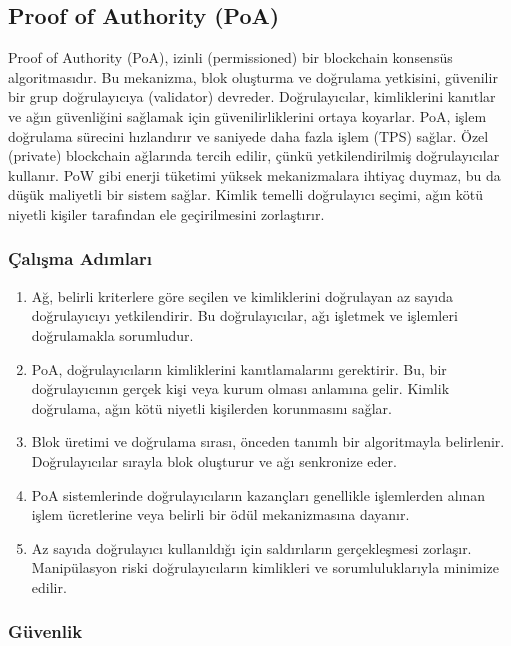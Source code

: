 \newpage

\subsection{Proof of Authority (PoA)}

Proof of Authority (PoA), izinli (permissioned) bir blockchain konsensüs algoritmasıdır. Bu mekanizma, blok oluşturma ve doğrulama yetkisini, güvenilir bir grup doğrulayıcıya (validator) devreder. Doğrulayıcılar, kimliklerini kanıtlar ve ağın güvenliğini sağlamak için güvenilirliklerini ortaya koyarlar. PoA, işlem doğrulama sürecini hızlandırır ve saniyede daha fazla işlem (TPS) sağlar. Özel (private) blockchain ağlarında tercih edilir, çünkü yetkilendirilmiş doğrulayıcılar kullanır. PoW gibi enerji tüketimi yüksek mekanizmalara ihtiyaç duymaz, bu da düşük maliyetli bir sistem sağlar. Kimlik temelli doğrulayıcı seçimi, ağın kötü niyetli kişiler tarafından ele geçirilmesini zorlaştırır.

\subsubsection{Çalışma Adımları}

\begin{enumerate}
    \item Ağ, belirli kriterlere göre seçilen ve kimliklerini doğrulayan az sayıda doğrulayıcıyı yetkilendirir. Bu doğrulayıcılar, ağı işletmek ve işlemleri doğrulamakla sorumludur.
    \item PoA, doğrulayıcıların kimliklerini kanıtlamalarını gerektirir. Bu, bir doğrulayıcının gerçek kişi veya kurum olması anlamına gelir. Kimlik doğrulama, ağın kötü niyetli kişilerden korunmasını sağlar.
    \item Blok üretimi ve doğrulama sırası, önceden tanımlı bir algoritmayla belirlenir. Doğrulayıcılar sırayla blok oluşturur ve ağı senkronize eder.
    \item PoA sistemlerinde doğrulayıcıların kazançları genellikle işlemlerden alınan işlem ücretlerine veya belirli bir ödül mekanizmasına dayanır.
    \item Az sayıda doğrulayıcı kullanıldığı için saldırıların gerçekleşmesi zorlaşır. Manipülasyon riski doğrulayıcıların kimlikleri ve sorumluluklarıyla minimize edilir.
\end{enumerate}

\subsubsection{Güvenlik}

